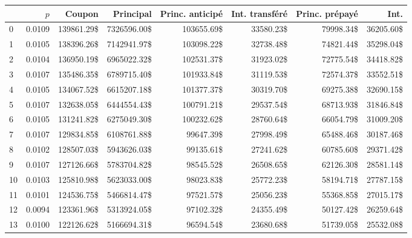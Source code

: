 \begin{tabular}{lrrrrrrr}
\toprule
{} &          $p$ &            Coupon &          Principal &   Princ. anticipé &   Int. transféré &   Princ. prépayé &             Int. \\
\midrule
0  & \num{0.0109} & \num{139861.29}\$ & \num{7326596.00}\$ & \num{103655.69}\$ & \num{33580.23}\$ & \num{79998.34}\$ & \num{36205.60}\$ \\
1  & \num{0.0105} & \num{138396.26}\$ & \num{7142941.97}\$ & \num{103098.22}\$ & \num{32738.48}\$ & \num{74821.44}\$ & \num{35298.04}\$ \\
2  & \num{0.0104} & \num{136950.19}\$ & \num{6965022.32}\$ & \num{102531.37}\$ & \num{31923.02}\$ & \num{72775.54}\$ & \num{34418.82}\$ \\
3  & \num{0.0107} & \num{135486.35}\$ & \num{6789715.40}\$ & \num{101933.84}\$ & \num{31119.53}\$ & \num{72574.37}\$ & \num{33552.51}\$ \\
4  & \num{0.0105} & \num{134067.52}\$ & \num{6615207.18}\$ & \num{101377.37}\$ & \num{30319.70}\$ & \num{69275.38}\$ & \num{32690.15}\$ \\
5  & \num{0.0107} & \num{132638.05}\$ & \num{6444554.43}\$ & \num{100791.21}\$ & \num{29537.54}\$ & \num{68713.93}\$ & \num{31846.84}\$ \\
6  & \num{0.0105} & \num{131241.82}\$ & \num{6275049.30}\$ & \num{100232.62}\$ & \num{28760.64}\$ & \num{66054.79}\$ & \num{31009.20}\$ \\
7  & \num{0.0107} & \num{129834.85}\$ & \num{6108761.88}\$ &  \num{99647.39}\$ & \num{27998.49}\$ & \num{65488.46}\$ & \num{30187.46}\$ \\
8  & \num{0.0102} & \num{128507.03}\$ & \num{5943626.03}\$ &  \num{99135.61}\$ & \num{27241.62}\$ & \num{60785.60}\$ & \num{29371.42}\$ \\
9  & \num{0.0107} & \num{127126.66}\$ & \num{5783704.82}\$ &  \num{98545.52}\$ & \num{26508.65}\$ & \num{62126.30}\$ & \num{28581.14}\$ \\
10 & \num{0.0103} & \num{125810.98}\$ & \num{5623033.00}\$ &  \num{98023.83}\$ & \num{25772.23}\$ & \num{58194.71}\$ & \num{27787.15}\$ \\
11 & \num{0.0101} & \num{124536.75}\$ & \num{5466814.47}\$ &  \num{97521.57}\$ & \num{25056.23}\$ & \num{55368.85}\$ & \num{27015.17}\$ \\
12 & \num{0.0094} & \num{123361.96}\$ & \num{5313924.05}\$ &  \num{97102.32}\$ & \num{24355.49}\$ & \num{50127.42}\$ & \num{26259.64}\$ \\
13 & \num{0.0100} & \num{122126.62}\$ & \num{5166694.31}\$ &  \num{96594.54}\$ & \num{23680.68}\$ & \num{51739.05}\$ & \num{25532.08}\$ \\

\end{tabular}
